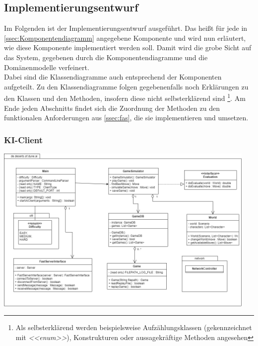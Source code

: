 \documentclass[12pt]{article}
\newcounter{fa}
\newcounter{nfa}
\begin{document}
\vspace{0.5cm}

\subsection{Implementierungsentwurf}
Im Folgenden ist der Implementierungsentwurf ausgeführt. Das heißt für jede in \autoref{ssec:Komponentendiagramm} angegebene Komponente und wird nun erläutert, wie diese Komponente implementiert werden soll. Damit wird die grobe Sicht auf das System, gegebenen durch die Komponentendiagramme und die Domänenmodelle verfeinert. \\ Dabei sind die Klassendiagramme auch entsprechend der Komponenten aufgeteilt. Zu den Klassendiagramme folgen gegebenenfalls noch Erklärungen zu den Klassen und den Methoden, insofern diese nicht selbsterklärend sind \footnote{Als selbsterklärend werden beispielsweise Aufzählungsklassen (gekennzeichnet mit \textit{<<enum>>}), Konstrukturen oder aussagekräftige Methoden angesehen}. Am Ende jeden Abschnitts findet sich die Zuordnung der Methoden zu den funktionalen Anforderungen aus \autoref{ssec:fas}, die sie implementieren und umsetzen. \\ 

\subsubsection{KI-Client}
\begin{center}
\includegraphics[width=0.95\textwidth]{images/KI-Client-Klassendiagramm}
\label{fig:KI-Client-Klassendiagramm}
\end{center}
\end{document}
